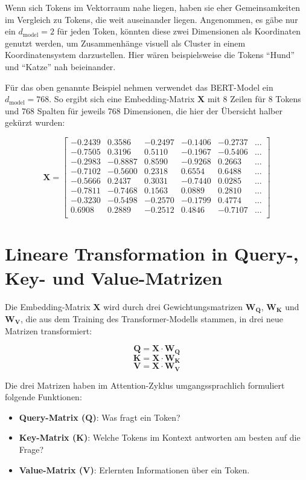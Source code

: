 Wenn sich Tokens im Vektorraum nahe liegen, haben sie eher Gemeinsamkeiten im Vergleich zu Tokens, die weit auseinander liegen.  
Angenommen, es gäbe nur ein \( d_{\text{model}} = 2 \) für jeden Token, könnten diese zwei Dimensionen als Koordinaten genutzt werden, um Zusammenhänge visuell als Cluster in einem Koordinatensystem darzustellen.  
Hier wären beispielsweise die Tokens \enquote{Hund} und \enquote{Katze} nah beieinander.

Für das oben genannte Beispiel nehmen verwendet das BERT-Model ein \( d_{\text{model}} = 768 \).  
So ergibt sich eine Embedding-Matrix $\mathbf{X}$ mit 8 Zeilen für 8 Tokens und 768 Spalten für jeweils 768 Dimensionen, die hier der Übersicht halber gekürzt wurden:

\[
\mathbf{X} =
\begin{bmatrix}
-0.2439 & 0.3586 & -0.2497 & -0.1406 & -0.2737 & \dots \\
-0.7505 & 0.3196 & 0.5110 & -0.1967 & -0.5406 & \dots \\
-0.2983 & -0.8887 & 0.8590 & -0.9268 & 0.2663 & \dots \\
-0.7102 & -0.5600 & 0.2318 & 0.6554 & 0.6488 & \dots \\
-0.5666 & 0.2437 & 0.3031 & -0.7440 & 0.0285 & \dots \\
-0.7811 & -0.7468 & 0.1563 & 0.0889 & 0.2810 & \dots \\
-0.3230 & -0.5498 & -0.2570 & -0.1799 & 0.4774 & \dots \\
0.6908 & 0.2889 & -0.2512 & 0.4846 & -0.7107 & \dots \\
\end{bmatrix}
\]

\section{Lineare Transformation in Query-, Key- und Value-Matrizen}

Die Embedding-Matrix $\mathbf{X}$ wird durch drei Gewichtungsmatrizen $\mathbf{W_Q}$, $\mathbf{W_K}$ und $\mathbf{W_V}$, die aus dem Training des Transformer-Modells stammen, in drei neue Matrizen transformiert:

\[
\mathbf{Q} = \mathbf{X} \cdot \mathbf{W_Q}
\]
\[
\mathbf{K} = \mathbf{X} \cdot \mathbf{W_K}
\]
\[
\mathbf{V} = \mathbf{X} \cdot \mathbf{W_V}
\]

Die drei Matrizen haben im Attention-Zyklus umgangssprachlich formuliert folgende Funktionen:

\begin{itemize}
    \item \textbf{Query-Matrix (\(\mathbf{Q}\))}: Was fragt ein Token?
    \item \textbf{Key-Matrix (\(\mathbf{K}\))}: Welche Tokens im Kontext antworten am besten auf die Frage?
    \item \textbf{Value-Matrix (\(\mathbf{V}\))}: Erlernten Informationen über ein Token.
\end{itemize}

